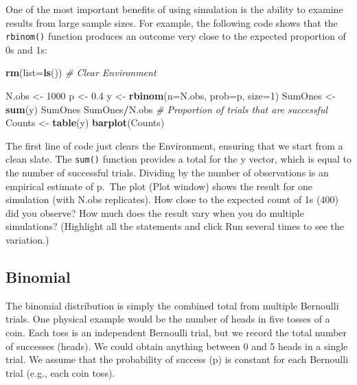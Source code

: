 \documentclass[
]{krantz}
\makeatletter
\newenvironment{Shaded}{\begin{snugshade}}{\end{snugshade}}
\newcommand{\AttributeTok}[1]{\textcolor[rgb]{0.27,0.27,0.27}{#1}}
\newcommand{\CommentTok}[1]{\textcolor[rgb]{0.37,0.37,0.37}{\textit{#1}}}
\newcommand{\DecValTok}[1]{\textcolor[rgb]{0.06,0.06,0.06}{#1}}
\newcommand{\FloatTok}[1]{\textcolor[rgb]{0.06,0.06,0.06}{#1}}
\newcommand{\FunctionTok}[1]{\textcolor[rgb]{0.27,0.27,0.27}{\textbf{#1}}}
\newcommand{\NormalTok}[1]{#1}
\newcommand{\OtherTok}[1]{\textcolor[rgb]{0.37,0.37,0.37}{#1}}
\newcommand{\SpecialCharTok}[1]{\textcolor[rgb]{0.43,0.43,0.43}{\textbf{#1}}}
\newenvironment{kframe}{%
\medskip{}
\setlength{\fboxsep}{.8em}
 \def\at@end@of@kframe{}%
 \ifinner\ifhmode%
  \def\at@end@of@kframe{\end{minipage}}%
  \begin{minipage}{\columnwidth}%
 \fi\fi%
 \def\FrameCommand##1{\hskip\@totalleftmargin \hskip-\fboxsep
 \colorbox{shadecolor}{##1}\hskip-\fboxsep
     \hskip-\linewidth \hskip-\@totalleftmargin \hskip\columnwidth}%
 \MakeFramed {\advance\hsize-\width
   \@totalleftmargin\z@ \linewidth\hsize
   \@setminipage}}%
 {\par\unskip\endMakeFramed%
 \at@end@of@kframe}
\renewenvironment{Shaded}{\begin{kframe}}{\end{kframe}}
\makeatother
\begin{document}
One of the most important benefits of using simulation is the ability to examine results from large sample sizes. For example, the following code shows that the \texttt{rbinom()} function produces an outcome very close to the expected proportion of 0s and 1s:

\begin{Shaded}
\begin{Highlighting}[]
\FunctionTok{rm}\NormalTok{(}\AttributeTok{list=}\FunctionTok{ls}\NormalTok{()) }\CommentTok{\# Clear Environment}

\NormalTok{N.obs }\OtherTok{\textless{}{-}} \DecValTok{1000}
\NormalTok{p }\OtherTok{\textless{}{-}} \FloatTok{0.4}
\NormalTok{y }\OtherTok{\textless{}{-}} \FunctionTok{rbinom}\NormalTok{(}\AttributeTok{n=}\NormalTok{N.obs, }\AttributeTok{prob=}\NormalTok{p, }\AttributeTok{size=}\DecValTok{1}\NormalTok{)}
\NormalTok{SumOnes }\OtherTok{\textless{}{-}} \FunctionTok{sum}\NormalTok{(y)}
\NormalTok{SumOnes}
\NormalTok{SumOnes}\SpecialCharTok{/}\NormalTok{N.obs }\CommentTok{\# Proportion of trials that are successful}
\NormalTok{Counts }\OtherTok{\textless{}{-}} \FunctionTok{table}\NormalTok{(y)}
\FunctionTok{barplot}\NormalTok{(Counts)}
\end{Highlighting}
\end{Shaded}

The first line of code just clears the Environment, ensuring that we start from a clean slate. The \texttt{sum()} function provides a total for the y vector, which is equal to the number of successful trials. Dividing by the number of observations is an empirical estimate of p.~The plot (Plot window) shows the result for one simulation (with N.obs replicates). How close to the expected count of 1s (400) did you observe? How much does the result vary when you do multiple simulations? (Highlight all the statements and click Run several times to see the variation.)

\hypertarget{BinomialDist}{%
\subsection{Binomial}\label{BinomialDist}}

The binomial distribution is simply the combined total from multiple Bernoulli trials. One physical example would be the number of heads in five tosses of a coin. Each toss is an independent Bernoulli trial, but we record the total number of successes (heads). We could obtain anything between 0 and 5 heads in a single trial. We assume that the probability of success (p) is constant for each Bernoulli trial (e.g., each coin toss).
\end{document}
